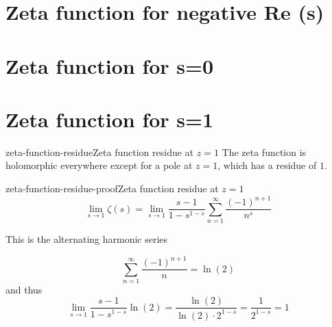 \documentclass[preview]{standalone}
\begin{document}
\section{Zeta function for negative Re (s)}

\section{Zeta function for s=0}

\section{Zeta function for s=1}

\begin{snippetproposition}{zeta-function-residue}{Zeta function residue at \(z=1\)}
    The zeta function is holomorphic everywhere except for a pole at \(z=1\), which has a residue of \(1\).
\end{snippetproposition}

\begin{snippetproof}{zeta-function-residue-proof}{Zeta function residue at \(z=1\)}
    \[
        \lim_{s\to 1} \zeta(s) =
        \lim_{s\to 1} \frac{s-1}{1-s^{1-s}} \sum_{n=1}^{\infty} \frac{{(-1)}^{n+1}}{n^s}
    \]
    
    This is the alternating harmonic series
    
    \[
        \sum_{n=1}^{\infty} \frac{{(-1)}^{n+1}}{n}=\ln(2)
    \]
    and thus
    \[
        \lim_{s\to 1} \frac{s-1}{1-s^{1-s}} \ln(2)
        = \frac{\ln(2)}{\ln(2) \cdot 2^{1-s}}
        = \frac{1}{2^{1-s}} = 1
    \]
\end{snippetproof}

\end{document}
